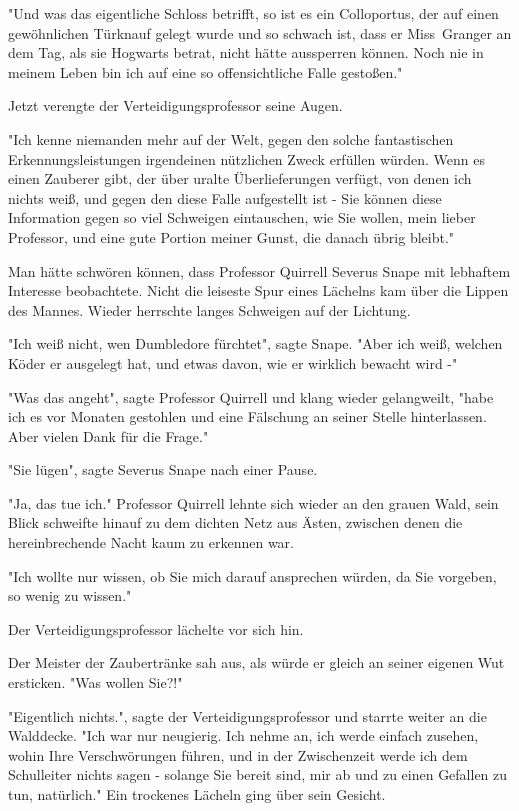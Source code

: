 {"Und was das eigentliche Schloss betrifft, so ist es ein Colloportus, der auf einen gewöhnlichen Türknauf gelegt wurde und so schwach ist, dass er Miss~Granger an dem Tag, als sie Hogwarts betrat, nicht hätte aussperren können. Noch nie in meinem Leben bin ich auf eine so offensichtliche Falle gestoßen."

Jetzt verengte der Verteidigungsprofessor seine Augen.

"Ich kenne niemanden mehr auf der Welt, gegen den solche fantastischen Erkennungsleistungen irgendeinen nützlichen Zweck erfüllen würden. Wenn es einen Zauberer gibt, der über uralte Überlieferungen verfügt, von denen ich nichts weiß, und gegen den diese Falle aufgestellt ist - Sie können diese Information gegen so viel Schweigen eintauschen, wie Sie wollen, mein lieber Professor, und eine gute Portion meiner Gunst, die danach übrig bleibt."

Man hätte schwören können, dass Professor Quirrell Severus Snape mit lebhaftem Interesse beobachtete. Nicht die leiseste Spur eines Lächelns kam über die Lippen des Mannes. Wieder herrschte langes Schweigen auf der Lichtung.

"Ich weiß nicht, wen Dumbledore fürchtet", sagte Snape. "Aber ich weiß, welchen Köder er ausgelegt hat, und etwas davon, wie er wirklich bewacht wird -"

"Was das angeht", sagte Professor Quirrell und klang wieder gelangweilt, "habe ich es vor Monaten gestohlen und eine Fälschung an seiner Stelle hinterlassen. Aber vielen Dank für die Frage."

"Sie lügen", sagte Severus Snape nach einer Pause.

"Ja, das tue ich." Professor Quirrell lehnte sich wieder an den grauen Wald, sein Blick schweifte hinauf zu dem dichten Netz aus Ästen, zwischen denen die hereinbrechende Nacht kaum zu erkennen war.

"Ich wollte nur wissen, ob Sie mich darauf ansprechen würden, da Sie vorgeben, so wenig zu wissen."

Der Verteidigungsprofessor lächelte vor sich hin.

Der Meister der Zaubertränke sah aus, als würde er gleich an seiner eigenen Wut ersticken. "Was wollen Sie?!"

"Eigentlich nichts.", sagte der Verteidigungsprofessor und starrte weiter an die Walddecke. "Ich war nur neugierig. Ich nehme an, ich werde einfach zusehen, wohin Ihre Verschwörungen führen, und in der Zwischenzeit werde ich dem Schulleiter nichts sagen - solange Sie bereit sind, mir ab und zu einen Gefallen zu tun, natürlich." Ein trockenes Lächeln ging über sein Gesicht.

}
